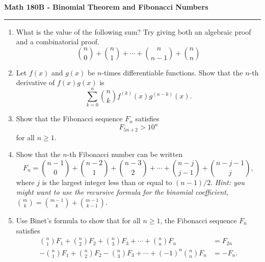 \documentclass[11pt,letterpaper]{report}
\begin{document}
\begin{center}
{\bf \Large Math 180B - Binomial Theorem and Fibonacci Numbers}
\vspace{0.2cm}
\hrule
\end{center}


\begin{enumerate}
	\item What is the value of the following sum? Try giving both an algebraic proof and a combinatorial proof.
	\[
	\binom{n}{0} + \binom{n}{1} + \cdots + \binom{n}{n-1}+\binom{n}{n}
	\]

	\vfill

	\item Let $f(x)$ and $g(x)$ be $n$-times differentiable functions. Show that the $n$-th derivative of $f(x)g(x)$ is
	\[
	\sum_{k=0}^n\binom{n}{k}f^{(k)}(x)g^{(n-k)}(x).
	\]

	\vfill

	\item Show that the Fibonacci sequence $F_n$ satisfies
	\[
	F_{5n+2} > 10^n
	\]
	for all $n\geq 1$.

	\vfill

	\item Show that the $n$-th Fibonacci number can be written
	\[
	F_n = \binom{n-1}{0} + \binom{n-2}{1} + \binom{n-3}{2} + \cdots + \binom{n-j}{j-1} + \binom{n-j-1}{j},
	\]
	where $j$ is the largest integer less than or equal to $(n-1)/2$. \textit{Hint: you might want to use the recursive formula for the binomial coefficient, $\binom{m}{k} = \binom{m-1}{k} + \binom{m-1}{k-1}$.}

	\vfill

	\item Use Binet's formula to show that for all $n\geq 1$, the Fibonacci sequence $F_n$ satisfies
	\begin{align*}
	\binom{n}{1}F_1 + \binom{n}{2}F_2 + \binom{n}{3}F_3 + \cdots + \binom{n}{n}F_n &= F_{2n}\\
	-\binom{n}{1}F_1 + \binom{n}{2}F_2 - \binom{n}{3}F_3 +  \cdots + (-1)^n\binom{n}{n}F_n &= -F_n.
	\end{align*}

	\vfill
\end{enumerate}
\end{document}
